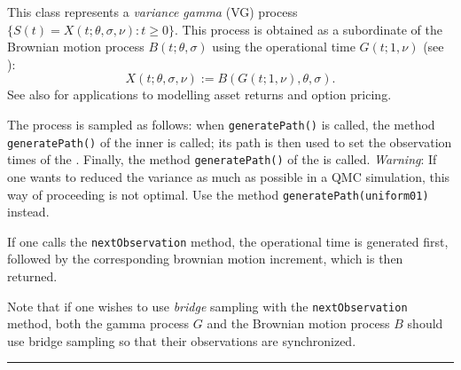 %
%


This class represents a \emph{variance gamma} (VG) process
$\{S(t) = X(t; \theta, \sigma, \nu) : t \geq 0\}$. This process is
obtained as a subordinate of the Brownian motion process $B(t;\theta,\sigma)$
using the operational time $G(t;1,\nu)$ (see \cite{pFEL66a,fAVR06a}):
\begin{equation}
X(t; \theta, \sigma, \nu) := B(G(t;1,\nu),\theta, \sigma).
\label{VGeqn}
\end{equation}
See also \cite{fMAD98a,fMAD91a,fMAD90a} for applications to modelling
asset returns and option pricing.

The process is sampled as follows: when \texttt{generatePath()} is called, the method
\texttt{generate\-Path()} of the inner  is called;
its path is then used to set the observation times of the
.  Finally, the method \texttt{generatePath()} of
the  is called.
\emph{Warning}: If one wants to reduced the variance as much as possible
in a QMC simulation, this way of proceeding is not optimal.  Use
the method \texttt{generatePath(uniform01)} instead.

If one calls the \texttt{nextObservation} method, the operational
time is generated first, followed by the corresponding
brownian motion increment, which is then returned.

Note that if one wishes to use \emph{bridge} sampling with the
\texttt{nextObservation} method, both the gamma process $G$
and the Brownian motion process $B$ should use bridge sampling so that
their observations are synchronized.

\bigskip\hrule\bigskip

